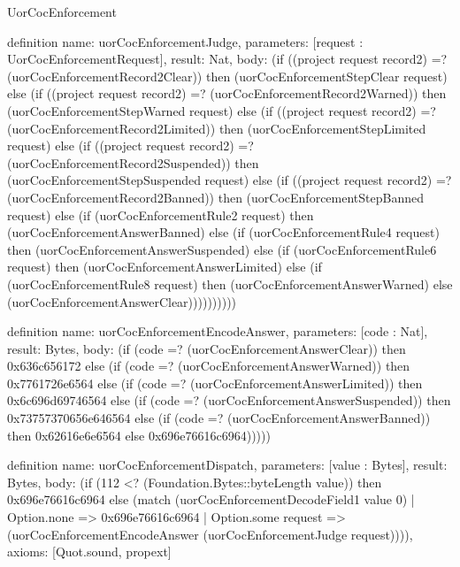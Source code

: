 \begin{lexlean}{UorCocEnforcement}
\begin{semanticmodule}
definition{
  name: uorCocEnforcementJudge,
  parameters: [request : UorCocEnforcementRequest],
  result: Nat,
  body: (if ((project request record2) =? (uorCocEnforcementRecord2Clear)) then (uorCocEnforcementStepClear request) else (if ((project request record2) =? (uorCocEnforcementRecord2Warned)) then (uorCocEnforcementStepWarned request) else (if ((project request record2) =? (uorCocEnforcementRecord2Limited)) then (uorCocEnforcementStepLimited request) else (if ((project request record2) =? (uorCocEnforcementRecord2Suspended)) then (uorCocEnforcementStepSuspended request) else (if ((project request record2) =? (uorCocEnforcementRecord2Banned)) then (uorCocEnforcementStepBanned request) else (if (uorCocEnforcementRule2 request) then (uorCocEnforcementAnswerBanned) else (if (uorCocEnforcementRule4 request) then (uorCocEnforcementAnswerSuspended) else (if (uorCocEnforcementRule6 request) then (uorCocEnforcementAnswerLimited) else (if (uorCocEnforcementRule8 request) then (uorCocEnforcementAnswerWarned) else (uorCocEnforcementAnswerClear))))))))))
}

definition{
  name: uorCocEnforcementEncodeAnswer,
  parameters: [code : Nat],
  result: Bytes,
  body: (if (code =? (uorCocEnforcementAnswerClear)) then 0x636c656172 else (if (code =? (uorCocEnforcementAnswerWarned)) then 0x7761726e6564 else (if (code =? (uorCocEnforcementAnswerLimited)) then 0x6c696d69746564 else (if (code =? (uorCocEnforcementAnswerSuspended)) then 0x73757370656e646564 else (if (code =? (uorCocEnforcementAnswerBanned)) then 0x62616e6e6564 else 0x696e76616c6964)))))
}

definition{
  name: uorCocEnforcementDispatch,
  parameters: [value : Bytes],
  result: Bytes,
  body: (if (112 <? (Foundation.Bytes::byteLength value)) then 0x696e76616c6964 else (match (uorCocEnforcementDecodeField1 value 0)
    | Option.none => 0x696e76616c6964
    | Option.some request => (uorCocEnforcementEncodeAnswer (uorCocEnforcementJudge request)))),
  axioms: [Quot.sound, propext]
}
\end{semanticmodule}
\end{lexlean}
